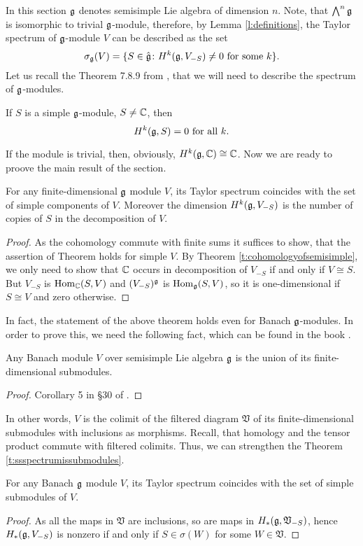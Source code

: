In this section $\mathfrak{g}$ denotes semisimple Lie algebra of dimension $n$. Note, that $\bigwedge^n
\mathfrak{g}$ is isomorphic to trivial $\mathfrak{g}$-module, therefore, by Lemma \ref{l:definitions}, the Taylor
spectrum of $\mathfrak{g}$-module $V$ can be described as the set
\[
    \sigma_{\mathfrak{g}}(V) = \{ S \in \hat{\mathfrak{g}} \colon H^k(\mathfrak{g}, V_{-S})\neq 0 \text{ for some } k\}.
\]
Let us recall the Theorem 7.8.9 from \cite{weibel}, that we will need to describe the spectrum
of $\mathfrak{g}$-modules.
\begin{theorem} \label{t:cohomologyofsemisimple}
If $S$ is a simple $\mathfrak{g}$-module, $S \neq \mathbb{C}$, then 
\[
    H^k(\mathfrak{g}, S) = 0 \text{ for all } k.
\]
\end{theorem}
If the module is trivial, then, obviously, $H^k(\mathfrak{g}, \mathbb{C}) \cong \mathbb{C}$. Now we are ready to proove
the main result of the section.
\begin{theorem} \label{t:ssspectrumissubmodules}
    For any finite-dimensional $\mathfrak{g}$ module $V$, its Taylor spectrum coincides with the set of
    simple components of $V$. Moreover the dimension $H^k(\mathfrak{g}, V_{-S})$ is the number of copies
    of $S$ in the decomposition of $V$.
\end{theorem}
\begin{proof}
    As the cohomology commute with finite sums it suffices to show, that the assertion of Theorem holds for
    simple $V$. By Theorem \ref{t:cohomologyofsemisimple}, we only need to show that $\mathbb{C}$ occurs
    in decomposition of $V_{-S}$ if and only if $V\cong S$. But $V_{-S}$ is $\operatorname{Hom}_{\mathbb{C}}(S, V)$ and
    $(V_{-S})^{\mathfrak{g}}$ is $\operatorname{Hom}_{\mathfrak{g}}(S, V)$, so it is one-dimensional if $S\cong V$ and zero
    otherwise.
\end{proof}
In fact, the statement of the above theorem holds even for Banach $\mathfrak{g}$-modules. In order to
prove this, we need the following fact, which can be found in the book \cite{beltita}.

\begin{theorem}
    Any Banach module $V$ over semisimple Lie algebra $\mathfrak{g}$ is the union of its
    finite-dimensional submodules. 
\end{theorem}
\begin{proof}
    Corollary 5 in \S30 of \cite{beltita}.
\end{proof}
In other words, $V$ is the colimit of the filtered diagram $\mathfrak{V}$ of its finite-dimensional submodules
with inclusions as morphisms. Recall, that homology and the tensor product commute with filtered
colimits. Thus, we can strengthen the Theorem \ref{t:ssspectrumissubmodules}.
\begin{corollary}
    For any Banach $\mathfrak{g}$ module $V$, its Taylor spectrum coincides with the set of
    simple submodules of $V$. 
\end{corollary}
\begin{proof}
    As all the maps in $\mathfrak{V}$ are inclusions, so are maps in $H_*(\mathfrak{g}, \mathfrak{V}_{-S})$,
    hence $H_*(\mathfrak{g}, V_{-S})$ is nonzero if and only if $S \in \sigma(W)$ for some $W\in
    \mathfrak{V}$.
\end{proof}

